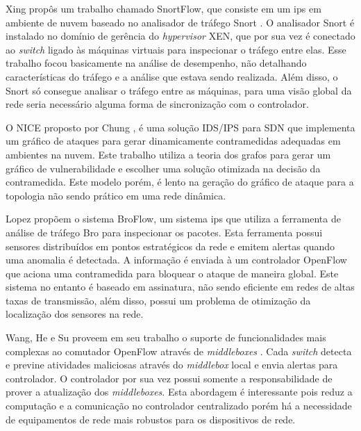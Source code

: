 Xing \cite{Xing:2013} propôs um trabalho chamado SnortFlow, que consiste em um \gls{ips} em ambiente de nuvem baseado no analisador de tráfego Snort \cite{Roesch:1999}. O analisador Snort é instalado no domínio de gerência do \textit{hypervisor} XEN, que por sua vez é conectado ao \textit{switch} ligado às máquinas virtuais para inspecionar o tráfego entre elas. Esse trabalho focou basicamente na análise de desempenho, não detalhando características do tráfego e a análise que estava sendo realizada. Além disso, o Snort só consegue analisar o tráfego entre as máquinas, para uma visão global da rede seria necessário alguma forma de sincronização com o controlador.


O NICE proposto por Chung \cite{Chung:2013}, é uma solução IDS/IPS para SDN que implementa um gráfico de ataques para gerar dinamicamente contramedidas adequadas em ambientes na nuvem. Este trabalho utiliza a teoria dos grafos para gerar um gráfico de vulnerabilidade e escolher uma solução otimizada na decisão da contramedida. Este modelo porém, é lento na geração do gráfico de ataque para a topologia não sendo prático em uma rede dinâmica.


Lopez \cite{Lopez:2014} propõem o sistema BroFlow, um sistema \gls{ips} que utiliza a ferramenta de análise de tráfego Bro \cite{Sommer:2010} para inspecionar os pacotes. Esta ferramenta possui sensores distribuídos em pontos estratégicos da rede e emitem alertas quando uma anomalia é detectada. A informação é enviada à um controlador OpenFlow que aciona uma contramedida para bloquear o ataque de maneira global. Este sistema no entanto é baseado em assinatura, não sendo eficiente em redes de altas taxas de transmissão, além disso, possui um problema de otimização da localização dos sensores na rede.

%
Wang, He e Su \cite{Wang:2015} proveem em seu trabalho o suporte de funcionalidades mais complexas ao comutador OpenFlow através de \textit{middleboxes} \cite{RFC3234}. Cada \textit{switch} detecta e previne atividades maliciosas através do \textit{middlebox} local e envia alertas para controlador. O controlador por sua vez possui somente a responsabilidade de prover a atualização dos \textit{middleboxes}. Esta abordagem é interessante pois reduz a computação e a comunicação no controlador centralizado porém há a necessidade de equipamentos de rede mais robustos para os dispositivos de rede.


